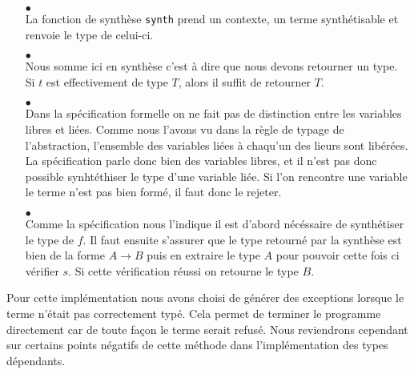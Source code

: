 \documentclass {article}
\newcommand{\codefrom}[3]
           {}
\theoremstyle{definition}
\theoremstyle{remark}
\begin{document}
\begin{itemize}
\item[$\bullet$] \\

La fonction de synthèse \lstinline!synth! prend un contexte, un
terme synthétisable et renvoie le type de celui-ci.

 \codefrom{typed}{lambda}{synth_def}

\item[$\bullet$]  \\

  Nous somme ici en synthèse c'est à dire que nous devons retourner un type.
  Si $t$ est effectivement de type $T$, alors il suffit de retourner $T$.
\codefrom{typed}{lambda}{synth_ann}



\item[$\bullet$] \\

Dans la spécification formelle on ne fait pas de distinction entre les variables libres et liées.
Comme nous l'avons vu dans la règle de typage de l'abstraction, l'ensemble des variables
liées à chaqu'un des lieurs sont libérées. La spécification parle donc bien des variables libres,
et il n'est pas donc possible synhtéthiser le type d'une variable liée. Si l'on rencontre une variable
le terme n'est pas bien formé, il faut donc le rejeter.

\codefrom{typed}{lambda}{synth_var}

\item[$\bullet$] \\

  
  Comme la spécification nous l'indique il est d'abord nécéssaire de synthétiser le type de $f$.
  Il faut ensuite s'assurer que le type retourné par la synthèse est bien de la forme $A\rightarrow B$
  puis en extraire le type $A$ pour pouvoir cette fois ci vérifier $s$. Si cette vérification réussi
  on retourne le type $B$.
 
\codefrom{typed}{lambda}{synth_appl}

\end{itemize}

Pour cette implémentation nous avons choisi de générer des exceptions lorsque le terme
n'était pas correctement typé. Cela permet de terminer le programme directement car de toute
façon le terme serait refusé. Nous reviendrons cependant sur certains points négatifs de cette
méthode dans l'implémentation des types dépendants.
\end{document}
